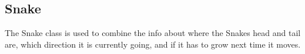 \subsection{Snake}

The Snake class is used to combine the info about where the Snakes head and tail are, which direction it is currently going, and if it has to grow next time it moves.

